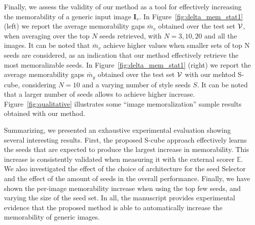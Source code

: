\documentclass{sig-alternate-05-2015}
\begin{document}
Finally, we assess the validity of our method as a tool for effectively increasing the memorability of a generic input image $\mathbf{I}_v$. 
In Figure~\ref{fig:delta_mem_stat1} (left) we report the average memorability gaps $\bar{m}_v$ obtained over the test set $\cal V$, when averaging over the top $N$ seeds retrieved, with $N=3,10,20$ and all the images. It can be noted that $\bar{m}_v$ achieve higher values when smaller sets of top N seeds are considered, as an indication that our method effectively retrieve the most memoralizable seeds. In Figure~\ref{fig:delta_mem_stat1} (right) we report the average memorability gaps $\bar{m}_g$ obtained over the test set $\cal V$ with our mehtod S-cube, considering $N=10$ and a varying number of style seeds $S$. It can be noted that a larger number of seeds allows to achieve higher increase.
Figure~\ref{fig:qualitative} illustrates some ``image memoralization'' sample results obtained with our method. %




Summarizing, we presented an exhaustive experimental evaluation showing several interesting results. First, the proposed S-cube approach effectively learns the seeds that are expected to produce the largest increase in memorability. This increase is consistently validated when measuring it with the external scorer $\mathbb{E}$. We also investigated the effect of the choice of architecture for the seed Selector and the effect of the amount of seeds in the overall performance. Finally, we have shown the per-image memorability increase when using the top few seeds, and varying the size of the seed set. In all, the manuscript provides experimental evidence that the proposed method is able to automatically increase the memorability of generic images.
\end{document}
